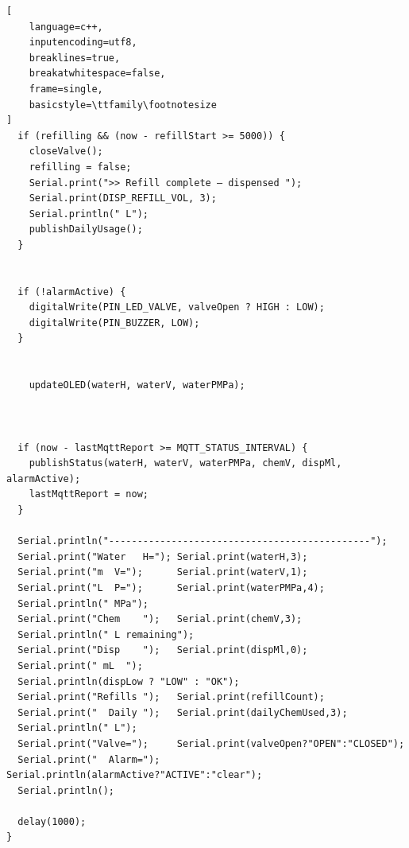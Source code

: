 \documentclass[12pt,a4paper]{article}
\begin{document}
\begin{lstlisting}[
    language=c++,
    inputencoding=utf8,
    breaklines=true,
    breakatwhitespace=false,
    frame=single,
    basicstyle=\ttfamily\footnotesize
]
  if (refilling && (now - refillStart >= 5000)) {
    closeValve();
    refilling = false;
    Serial.print(">> Refill complete — dispensed ");
    Serial.print(DISP_REFILL_VOL, 3);
    Serial.println(" L");
    publishDailyUsage();
  }

  
  if (!alarmActive) {
    digitalWrite(PIN_LED_VALVE, valveOpen ? HIGH : LOW);
    digitalWrite(PIN_BUZZER, LOW);
  }


    updateOLED(waterH, waterV, waterPMPa);


  
  if (now - lastMqttReport >= MQTT_STATUS_INTERVAL) {
    publishStatus(waterH, waterV, waterPMPa, chemV, dispMl, alarmActive);
    lastMqttReport = now;
  }

  Serial.println("----------------------------------------------");
  Serial.print("Water   H="); Serial.print(waterH,3);
  Serial.print("m  V=");      Serial.print(waterV,1);
  Serial.print("L  P=");      Serial.print(waterPMPa,4);
  Serial.println(" MPa");
  Serial.print("Chem    ");   Serial.print(chemV,3);
  Serial.println(" L remaining");
  Serial.print("Disp    ");   Serial.print(dispMl,0);
  Serial.print(" mL  ");
  Serial.println(dispLow ? "LOW" : "OK");
  Serial.print("Refills ");   Serial.print(refillCount);
  Serial.print("  Daily ");   Serial.print(dailyChemUsed,3);
  Serial.println(" L");
  Serial.print("Valve=");     Serial.print(valveOpen?"OPEN":"CLOSED");
  Serial.print("  Alarm=");   Serial.println(alarmActive?"ACTIVE":"clear");
  Serial.println();

  delay(1000);
}
\end{lstlisting}
\end{document}
